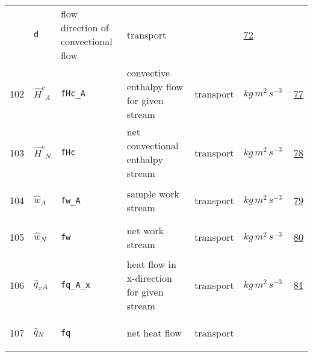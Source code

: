 \begin{longtable}{|p{1cm}|p{2.5cm}|p{4.5cm}|p{8cm}|p{3.0cm}|p{3cm}|p{1cm}|}
             & \verb|d|
             & flow direction of convectional flow
             & \begin{lay}transport \end{lay}
             & $  $
             & \hyperlink{"e:72"}{ 72 }
                 \\
    102
             & \hypertarget{"v:102"}{ $ {{\hat{H}^c}}{_{A}} $}
             & \verb|fHc_A|
             & convective enthalpy flow for given stream
             & \begin{lay}transport \end{lay}
             & $ kg \,m^{2} \,s^{-3} \, $
             & \hyperlink{"e:77"}{ 77 }
                 \\
    103
             & \hypertarget{"v:103"}{ $ {{\hat{H}^c}}{_{N}} $}
             & \verb|fHc|
             & net convectional enthalpy stream
             & \begin{lay}transport \end{lay}
             & $ kg \,m^{2} \,s^{-3} \, $
             & \hyperlink{"e:78"}{ 78 }
                 \\
    104
             & \hypertarget{"v:104"}{ $ {{\hat{w}}}{_{A}} $}
             & \verb|fw_A|
             & sample work stream
             & \begin{lay}transport \end{lay}
             & $ kg \,m^{2} \,s^{-3} \, $
             & \hyperlink{"e:79"}{ 79 }
                 \\
    105
             & \hypertarget{"v:105"}{ $ {{\hat{w}}}{_{N}} $}
             & \verb|fw|
             & net work stream
             & \begin{lay}transport \end{lay}
             & $ kg \,m^{2} \,s^{-3} \, $
             & \hyperlink{"e:80"}{ 80 }
                 \\
    106
             & \hypertarget{"v:106"}{ $ {{\hat{q}_{x}}}{_{A}} $}
             & \verb|fq_A_x|
             & heat flow in x-direction for given stream
             & \begin{lay}transport \end{lay}
             & $ kg \,m^{2} \,s^{-3} \, $
             & \hyperlink{"e:81"}{ 81 }
                 \\
    107
             & \hypertarget{"v:107"}{ $ {{\hat{q}}}{_{N}} $}
             & \verb|fq|
             & net heat flow
             & \begin{lay}transport \end{lay}

\end{longtable}
